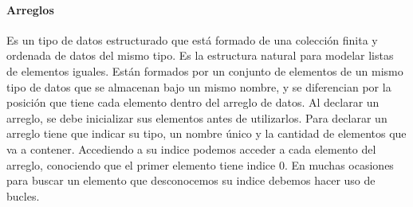 \paragraph{Arreglos} Es un tipo de datos estructurado que está formado de una colección finita y ordenada de datos del mismo tipo. Es la estructura natural para modelar listas de elementos iguales. Están formados por un conjunto de elementos de un mismo tipo de datos que se almacenan bajo un mismo nombre, y se diferencian por la posición que tiene cada elemento dentro del arreglo de datos. Al declarar un arreglo, se debe inicializar sus elementos antes de utilizarlos. Para declarar un arreglo tiene que indicar su tipo, un nombre único y la cantidad de elementos que va a contener. Accediendo a su indice podemos acceder a cada elemento del arreglo, conociendo que el primer elemento tiene indice 0. En muchas ocasiones para buscar un elemento que desconocemos su indice debemos hacer uso de bucles.

 